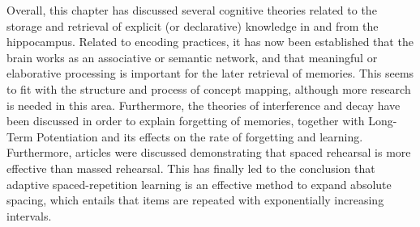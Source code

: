 Overall, this chapter has discussed several cognitive theories related to the storage and retrieval of explicit (or declarative) knowledge in and from the hippocampus. Related to encoding practices, it has now been established that the brain works as an associative or semantic network, and that meaningful or elaborative processing is important for the later retrieval of memories. This seems to fit with the structure and process of concept mapping, although more research is needed in this area. Furthermore, the theories of interference and decay have been discussed in order to explain forgetting of memories, together with Long-Term Potentiation and its effects on the rate of forgetting and learning. Furthermore, articles were discussed demonstrating that spaced rehearsal is more effective than massed rehearsal. This has finally led to the conclusion that adaptive spaced-repetition learning is an effective method to expand absolute spacing, which entails that items are repeated with exponentially increasing intervals.
